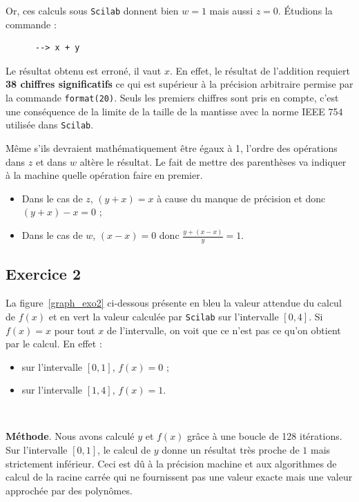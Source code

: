 \documentclass[a4paper,11pt]{article}
\theoremstyle{nonumberplain}
\theoremstyle{nonumberplain}
\theoremstyle{nonumberplain}
\begin{document}
    Or, ces calculs sous \texttt{Scilab} donnent bien $w = 1$ mais aussi $z = 0$. \'{E}tudions la commande :
    \begin{verbatim}
      --> x + y
    \end{verbatim}
    Le résultat obtenu est erroné, il vaut $x$. En effet, le résultat de l'addition requiert \textbf{38 chiffres significatifs} ce qui est supérieur à la précision arbitraire permise par la commande \texttt{format(20)}.
    Seuls les premiers chiffres sont pris en compte, c'est une conséquence de la limite de la taille de la mantisse avec la norme IEEE 754 utilisée dans \texttt{Scilab}.
    \newline

    Même s'ils devraient mathématiquement être égaux à 1, l'ordre des opérations dans $z$ et dans $w$ altère le résultat.
    Le fait de mettre des parenthèses va indiquer à la machine quelle opération faire en premier.
    \begin{itemize}
        \item Dans le cas de $z$, $(y + x) = x$ à cause du manque de précision et donc $(y + x) - x = 0$ ;
        \item Dans le cas de $w$, $(x - x) = 0$ donc $\frac{y + (x -x)}{y} = 1$.
    \end{itemize}


\subsection*{Exercice 2}

    La figure~\ref{graph_exo2} ci-dessous présente en bleu la valeur attendue du calcul de $f(x)$ et en vert la valeur calculée par \texttt{Scilab} sur l'intervalle $[0, 4]$.
    Si $f(x) = x$ pour tout $x$ de l'intervalle, on voit que ce n'est pas ce qu'on obtient par le calcul. En effet :

    \begin{itemize}
        \item sur l'intervalle $[0, 1]$, $f(x) = 0$ ;
        \item sur l'intervalle $[1, 4]$, $f(x) = 1$.
    \end{itemize}~\newline

    \textbf{Méthode}. Nous avons calculé $y$ et $f(x)$ grâce à une boucle de 128 itérations.
    Sur l'intervalle $[0, 1]$, le calcul de $y$ donne un résultat très proche de $1$ mais strictement inférieur. Ceci est dû à la précision machine
    et aux algorithmes de calcul de la racine carrée qui ne fournissent pas une valeur exacte mais une valeur approchée par des polynômes.
\end{document}
